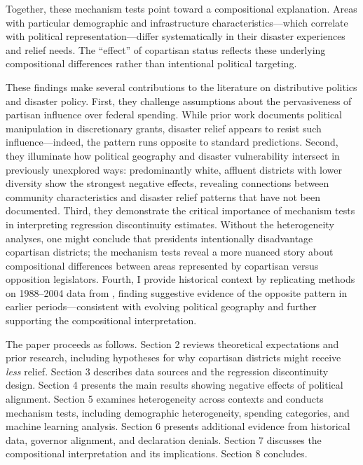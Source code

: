 \documentclass[12pt,letterpaper,oneside]{book}
\begin{document}
Together, these mechanism tests point toward a compositional explanation. Areas with particular demographic and infrastructure characteristics---which correlate with political representation---differ systematically in their disaster experiences and relief needs. The ``effect'' of copartisan status reflects these underlying compositional differences rather than intentional political targeting.

These findings make several contributions to the literature on distributive politics and disaster policy. First, they challenge assumptions about the pervasiveness of partisan influence over federal spending. While prior work documents political manipulation in discretionary grants, disaster relief appears to resist such influence---indeed, the pattern runs opposite to standard predictions. Second, they illuminate how political geography and disaster vulnerability intersect in previously unexplored ways: predominantly white, affluent districts with lower diversity show the strongest negative effects, revealing connections between community characteristics and disaster relief patterns that have not been documented. Third, they demonstrate the critical importance of mechanism tests in interpreting regression discontinuity estimates. Without the heterogeneity analyses, one might conclude that presidents intentionally disadvantage copartisan districts; the mechanism tests reveal a more nuanced story about compositional differences between areas represented by copartisan versus opposition legislators. Fourth, I provide historical context by replicating methods on 1988--2004 data from \cite{healy2009myopic}, finding suggestive evidence of the opposite pattern in earlier periods---consistent with evolving political geography and further supporting the compositional interpretation.

The paper proceeds as follows. Section 2 reviews theoretical expectations and prior research, including hypotheses for why copartisan districts might receive \emph{less} relief. Section 3 describes data sources and the regression discontinuity design. Section 4 presents the main results showing negative effects of political alignment. Section 5 examines heterogeneity across contexts and conducts mechanism tests, including demographic heterogeneity, spending categories, and machine learning analysis. Section 6 presents additional evidence from historical data, governor alignment, and declaration denials. Section 7 discusses the compositional interpretation and its implications. Section 8 concludes.
\end{document}
